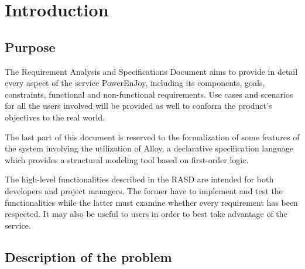 \chapter{Introduction}

\section{Purpose}
The Requirement Analysis and Specifications Document aims to provide in detail every aspect of the service PowerEnJoy, including its components, goals, constraints, functional and non-functional requirements. Use cases and scenarios for all the users involved will be provided as well to conform the product's objectives to the real world.

The last part of this document is reserved to the formalization of some features of the system involving the utilization of Alloy, a declarative specification language which provides a structural modeling tool based on first-order logic.

The high-level functionalities described in the RASD are intended for both developers and project managers. The former have to implement and test the functionalities while the latter must examine whether every requirement has been respected. It may also be useful to users in order to best take advantage of the service.

\section{Description of the problem}

